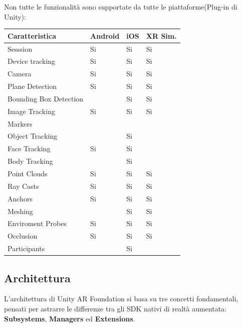 \begin{center}
Non tutte le funzionalità sono supportate da tutte le piattaforme(Plug-in di Unity):

\begin{tabular}{| l | p{2cm} | p{2cm} |p{2cm} |}
      \hline
      \rowcolor{gray!30}
      \textbf{Caratteristica} & \textbf{Android} & \textbf{iOS} & \textbf{XR Sim.} \\ 
      \hline
      Sesssion & Si & Si & Si\\ 
      \hline
      Device tracking & Si & Si & Si \\ 
      \hline
      Camera & Si & Si & Si \\ 
      \hline
      Plane Detection & Si & Si & Si \\ 
      \hline
      Bounding Box Detection & & Si & Si\\ 
      \hline
      Image Tracking & Si & Si & Si\\ 
      \hline
      Markers &  & & \\ 
      \hline
      Object Tracking & & Si & \\ 
      \hline
      Face Tracking & Si & Si &\\ 
      \hline
      Body Tracking & & Si & \\ 
      \hline
      Point Clouds & Si & Si & Si\\ 
      \hline
      Ray Casts & Si & Si & Si \\
     \hline
      Anchors & Si & Si & Si \\
      \hline
      Meshing &  & Si & Si\\
      \hline
      Enviroment Probes & Si & Si & Si\\
      \hline
      Occlusion & Si & Si & Si\\
      \hline
      Participants &  & Si & \\
      \hline
    \end{tabular}
\end{center}

 \subsection{Architettura}
 
L'architettura di Unity AR Foundation \cite{AR-Foundation-1} si basa su tre concetti fondamentali, pensati per astrarre le differenze tra gli SDK nativi di realtà aumentata: \textbf{Subsystems}, \textbf{Managers} ed \textbf{Extensions}. 

